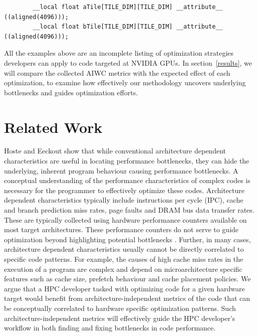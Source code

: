 \documentclass[review=false, sigchi]{acmart}
\begin{document}
	\begin{lstlisting}
		__local float aTile[TILE_DIM][TILE_DIM] __attribute__ ((aligned(4096)));
		__local float bTile[TILE_DIM][TILE_DIM] __attribute__ ((aligned(4096)));
	\end{lstlisting}
	
	All the examples above are an incomplete listing of optimization strategies developers can apply to code targeted at NVIDIA GPUs.
	In section~\ref{results}, we will compare the collected AIWC metrics with the expected effect of each optimization, to examine how effectively our methodology uncovers underlying bottlenecks and guides optimization efforts.
	
	\flushbottom
	\section{Related Work} \label{related work}
	
	Hoste and Eeckout \cite{hoste2007microarchitecture} show that while conventional architecture dependent characteristics are useful in locating performance bottlenecks, they can hide the underlying, inherent program behaviour causing performance bottlenecks. A conceptual understanding of the performance characteristics of complex codes is necessary for the programmer to effectively optimize these codes. Architecture dependent characteristics typically include instructions per cycle (IPC), cache and branch prediction miss rates, page faults and DRAM bus data transfer rates. These are typically collected using hardware performance counters available on most target architectures. These performance counters do not serve to guide optimization beyond highlighting potential bottlenecks \cite{hoste2007microarchitecture, ganesan2008performance}. Further, in many cases, architecture dependent characteristics usually cannot be directly correlated to specific code patterns.
	For example, the causes of high cache miss rates in the execution of a program are complex and depend on microarchitecture specific features such as cache size, prefetch behaviour and cache placement policies.
	We argue that a HPC developer tasked with optimizing code for a given hardware target would benefit from architecture-independent metrics of the code that can be conceptually correlated to hardware specific optimization patterns. Such architecture-independent metrics will effectively guide the HPC developer's workflow in both finding and fixing bottlenecks in code performance.
	
\end{document}
